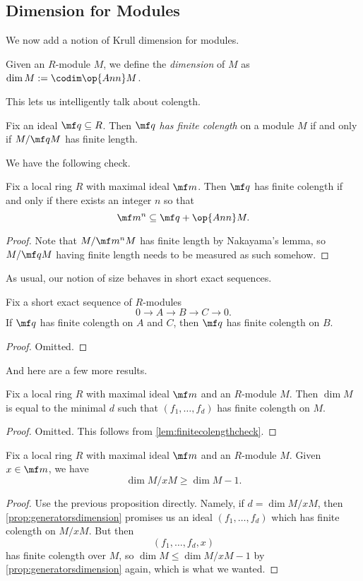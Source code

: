 \subsection{Dimension for Modules}
We now add a notion of Krull dimension for modules.
\begin{definition}
	Given an $R$-module $M$, we define the \textit{dimension} of $M$ as $\dim M:=\codim\op{Ann}M$.
\end{definition}
This lets us intelligently talk about colength.
\begin{definition}[Colength]
	Fix an ideal $\mf q\subseteq R$. Then $\mf q$ \textit{has finite colength} on a module $M$ if and only if $M/\mf qM$ has finite length.
\end{definition}
We have the following check.
\begin{lemma} \label{lem:finitecolengthcheck}
	Fix a local ring $R$ with maximal ideal $\mf m$. Then $\mf q$ has finite colength if and only if there exists an integer $n$ so that
	\[\mf m^n\subseteq\mf q+\op{Ann}M.\]
\end{lemma}
\begin{proof}
	Note that $M/\mf m^nM$ has finite length by Nakayama's lemma, so $M/\mf qM$ having finite length needs to be measured as such somehow.
\end{proof}
As usual, our notion of size behaves in short exact sequences.
\begin{proposition}
	Fix a short exact sequence of $R$-modules
	\[0\to A\to B\to C\to 0.\]
	If $\mf q$ has finite colength on $A$ and $C$, then $\mf q$ has finite colength on $B$.
\end{proposition}
\begin{proof}
	Omitted.
\end{proof}
And here are a few more results.
\begin{proposition} \label{prop:generatorsdimension}
	Fix a local ring $R$ with maximal ideal $\mf m$ and an $R$-module $M$. Then $\dim M$ is equal to the minimal $d$ such that $(f_1,\ldots,f_d)$ has finite colength on $M$.
\end{proposition}
\begin{proof}
	Omitted. This follows from \autoref{lem:finitecolengthcheck}.
\end{proof}
\begin{proposition}
	Fix a local ring $R$ with maximal ideal $\mf m$ and an $R$-module $M$. Given $x\in\mf m$, we have
	\[\dim M/xM\ge\dim M-1.\]
\end{proposition}
\begin{proof}
	Use the previous proposition directly. Namely, if $d=\dim M/xM$, then \autoref{prop:generatorsdimension} promises us an ideal $(f_1,\ldots,f_d)$ which has finite colength on $M/xM$. But then
	\[(f_1,\ldots,f_d,x)\]
	has finite colength over $M$, so $\dim M\le\dim M/xM-1$ by \autoref{prop:generatorsdimension} again, which is what we wanted.
\end{proof}

